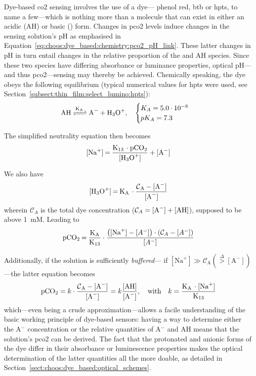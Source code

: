 Dye-based \gls{co2} sensing involves the use of a dye---\eg{} phenol red, \gls{btb} or \gls{hpts}, to name a few\cite{vurek1983, uttamlal1995, degrandpre1999, lu2008}---which is nothing more than a molecule that can exist in either an acidic (AH) or basic () form. Changes in \gls{pco2} levels induce changes in the sensing solution's pH as emphasised in Equation~\ref{eq:choos:dye_based:chemistry:pco2_pH_link}. These latter changes in pH in turn entail changes in the relative proportion of the  and AH species. Since these two species have differing absorbance or luminance properties, optical pH---and thus \gls{pco2}---sensing may thereby be achieved. Chemically speaking, the dye obeys the following equilibrium (typical numerical values for \gls{hpts} were used, see Section~\ref{subsect:thin_film:select_lumino:hpts}):
\begin{equation}\label{eq:choos:dye_based:chemistry:wet_dye}
	\ce{AH <=>[K_A] A^- + H_3O^+},\quad \begin{cases}
		K_A = 5.0\cdot 10^{-8} \\ pK_A = 7.3
	\end{cases}
\end{equation}

The simplified neutrality equation then becomes
\begin{equation}
	\ce{[Na^+] = \frac{K_{13} \cdot pCO_2}{[H_3O^+]} + [A^-] }
\end{equation}

We also have
\begin{equation}
	\ce{[H_3O^+] = K_A \cdot \frac{\mathcal{C}_A - [A^-]}{[A^-]}}
\end{equation}
wherein $\mathcal{C}_A$ is the total dye concentration ($\mathcal{C}_A = \ce{[A^-] + [AH]}$), supposed to be above 1~mM. Leading to
\begin{equation}\label{eq:choos:dye_based:chemistry:wet_aah_full}
	\ce{pCO_2 = \frac{K_A}{K_{13}}}\cdot \frac{\left([\text{Na}^+] - [A^-]\right)\cdot\left(\mathcal{C}_A - [A^-]\right)}{[A^-]}
\end{equation}

Additionally, if the solution is sufficiently \emph{buffered}---\ie{} if $[\text{Na}^+] \gg \mathcal{C}_\text{A} (\overset{\Delta}{>} [\text{A}^-])$---the latter equation becomes
\begin{equation}\label{eq:choos:dye_based:chemistry:wet_aah_buff}
	\ce{pCO_2} = k \cdot \ce{\frac{\mathcal{C}_A - [A^-]}{[A^-]}} = k \ce{\frac{[AH]}{[A^-]}}, \quad \text{with} \quad k = \ce{\frac{K_A \cdot [Na^+]}{K_{13}}}
\end{equation}
which---even being a crude approximation---allows a facile understanding of the basic working principle of dye-based sensors: having a way to determine either the A$^-$ concentration or the relative quantities of A$^-$ and AH means that the solution's \gls{pco2} can be derived. The fact that the protonated and anionic forms of the dye differ in their absorbance or luminescence properties makes the optical determination of the latter quantities all the more doable, as detailed in Section~\ref{sect:choos:dye_based:optical_schemes}.


